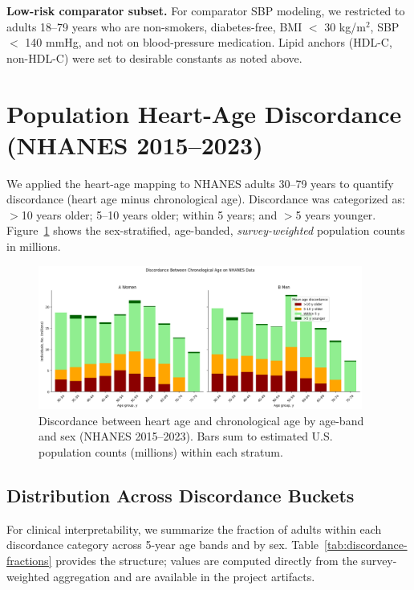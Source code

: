 \documentclass{article}
\begin{document}
\textbf{Low-risk comparator subset.} For comparator SBP modeling, we restricted to adults 18--79 years who are non-smokers, diabetes-free, BMI $<$ 30 kg/m$^2$, SBP $<$ 140 mmHg, and not on blood-pressure medication. Lipid anchors (HDL-C, non-HDL-C) were set to desirable constants as noted above.

\section{Population Heart-Age Discordance (NHANES 2015--2023)}
We applied the heart-age mapping to NHANES adults 30--79 years to quantify discordance (heart age minus chronological age). Discordance was categorized as: $>$10 years older; 5--10 years older; within 5 years; and $>$5 years younger. Figure~\ref{fig:discordance} shows the sex-stratified, age-banded, \emph{survey-weighted} population counts in millions.

\begin{figure}
  \centering
  \includegraphics[width=0.95\textwidth]{heart_age_discordance.png}
  \caption{Discordance between heart age and chronological age by age-band and sex (NHANES 2015--2023). Bars sum to estimated U.S. population counts (millions) within each stratum.}
  \label{fig:discordance}
\end{figure}

\subsection{Distribution Across Discordance Buckets}
For clinical interpretability, we summarize the fraction of adults within each discordance category across 5-year age bands and by sex. Table~\ref{tab:discordance-fractions} provides the structure; values are computed directly from the survey-weighted aggregation and are available in the project artifacts.
\end{document}
